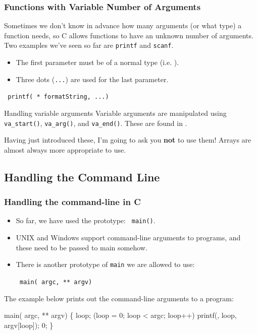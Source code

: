 \documentclass[smaller,table]{beamer}
\begin{document}
\begin{frame}
\frametitle{Functions with Variable Number of Arguments}
Sometimes we don't know in advance how many arguments (or what type) a function needs, so C allows functions to have an unknown number of arguments. Two examples we've seen so far are {\tt printf} and {\tt scanf}.

\begin{itemize}
\item The first parameter must be of a normal type (i.e. ).
\item Three dots ({\tt ...}) are used for the last parameter.
\end{itemize}
\begin{center}
{\tt {} printf( * formatString, ...)}
\end{center}
\begin{block}{Handling variable arguments}
Variable arguments are manipulated using {\tt va\_start()}, {\tt va\_arg()},
and {\tt va\_end()}. These are found in .
\end{block}

\begin{alertblock}{}
Having just introduced these, I'm going to ask you {\bf not} to use them! Arrays are almost always more appropriate to use.
\end{alertblock}
\end{frame}


\subsection{Handling the Command Line}
\begin{frame}[fragile]
\frametitle{Handling the command-line in C}
\begin{itemize}
\item So far, we have used the prototype: {\tt {} main()}.
\item UNIX and Windows support command-line arguments to programs, and these need to be passed to main somehow.
\item There is another prototype of {\tt main} we are allowed to use:\\
\begin{center}
\tt {} main( argc,  ** argv)
\end{center}
\end{itemize}
The example below prints out the command-line arguments to a program:
\vspace{-0.1in}
\begin{semiverbatim}
\small
{} 

 main( argc,  ** argv)
\{
    loop;
    (loop = 0; loop < argc; loop++)
      printf(, loop, argv[loop]);
    0;
\}
\end{semiverbatim}
\end{frame}
\end{document}
